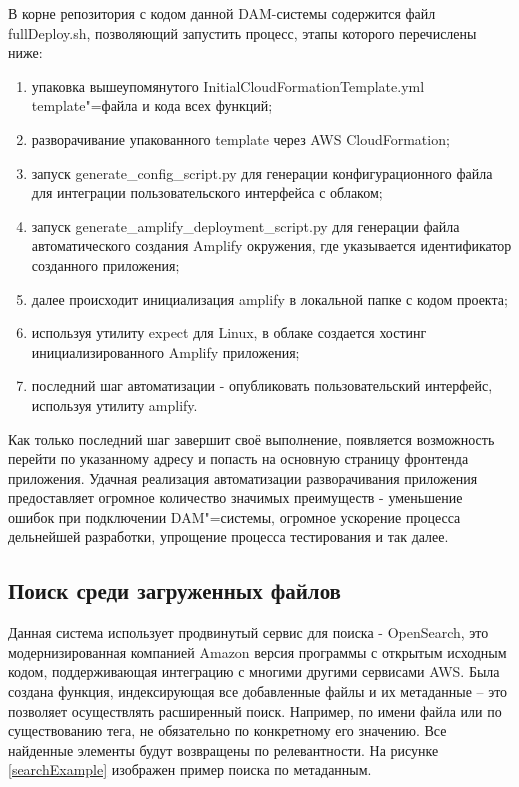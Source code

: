 В корне репозитория с кодом данной DAM-системы содержится файл fullDeploy.sh, позволяющий запустить процесс, этапы которого перечислены ниже:
\begin{enumerate}
\item упаковка вышеупомянутого InitialCloudFormationTemplate.yml template"=файла и кода всех функций;
\item разворачивание упакованного template через AWS CloudFormation;
\item запуск generate\_config\_script.py для генерации конфигурационного файла для интеграции пользовательского интерфейса с облаком;
\item запуск generate\_amplify\_deployment\_script.py для генерации файла автоматического создания Amplify окружения, где указывается идентификатор созданного приложения;
\item далее происходит инициализация amplify в локальной папке с кодом проекта;
\item используя утилиту expect для Linux, в облаке создается хостинг инициализированного Amplify приложения;
\item последний шаг автоматизации - опубликовать пользовательский интерфейс, используя утилиту amplify.
\end{enumerate}

Как только последний шаг завершит своё выполнение, появляется возможность перейти по указанному адресу и попасть на основную страницу фронтенда приложения. Удачная реализация автоматизации разворачивания приложения предоставляет огромное количество значимых преимуществ - уменьшение ошибок при подключении DAM"=системы, огромное ускорение процесса дельнейшей разработки, упрощение процесса тестирования и так далее.

\subsection{Поиск среди загруженных файлов}
Данная система использует продвинутый сервис для поиска - OpenSearch, это модернизированная компанией Amazon версия программы с открытым исходным кодом, поддерживающая интеграцию с многими другими сервисами AWS. Была создана функция, индексирующая все добавленные файлы и их метаданные -- это позволяет осуществлять расширенный поиск. Например, по имени файла или по существованию тега, не обязательно по конкретному его значению. Все найденные элементы будут возвращены по релевантности. На рисунке \ref{searchExample} изображен пример поиска по метаданным.

